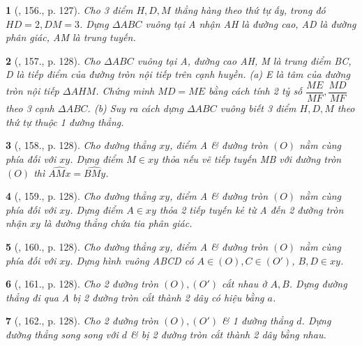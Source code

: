 \documentclass{article}
\newtheorem{baitoan}{}
\begin{document}
\begin{baitoan}[\cite{Binh_Toan_9_tap_1}, 156., p. 127]
	Cho 3 điểm $H,D,M$ thẳng hàng theo thứ tự ấy, trong đó $HD = 2,DM = 3$. Dựng $\Delta ABC$ vuông tại A nhận AH là đường cao, AD là đường phân giác, AM là trung tuyến.
\end{baitoan}

\begin{baitoan}[\cite{Binh_Toan_9_tap_1}, 157., p. 128]
	Cho $\Delta ABC$ vuông tại A, đường cao AH, M là trung điểm BC, D là tiếp điểm của đường tròn nội tiếp trên cạnh huyền. (a) E là tâm của đường tròn nội tiếp $\Delta AHM$. Chứng minh $MD = ME$ bằng cách tính 2 tỷ số $\dfrac{ME}{MF},\dfrac{MD}{MF}$ theo 3 cạnh $\Delta ABC$. (b) Suy ra cách dựng $\Delta ABC$ vuông biết 3 điểm $H,D,M$ theo thứ tự thuộc 1 đường thẳng.
\end{baitoan}

\begin{baitoan}[\cite{Binh_Toan_9_tap_1}, 158., p. 128]
	Cho đường thẳng $xy$, điểm A \& đường tròn $(O)$ nằm cùng phía đối với $xy$. Dựng điểm $M\in xy$ thỏa nếu vẽ tiếp tuyến MB với đường tròn $(O)$ thì $\widehat{AMx} = \widehat{BMy}$.
\end{baitoan}

\begin{baitoan}[\cite{Binh_Toan_9_tap_1}, 159., p. 128]
	Cho đường thẳng $xy$, điểm A \& đường tròn $(O)$ nằm cùng phía đối với $xy$. Dựng điểm $A\in xy$ thỏa 2 tiếp tuyến kẻ từ A đến 2 đường tròn nhận $xy$ là đường thẳng chứa tia phân giác.
\end{baitoan}

\begin{baitoan}[\cite{Binh_Toan_9_tap_1}, 160., p. 128]
	Cho đường thẳng $xy$, điểm A \& đường tròn $(O)$ nằm cùng phía đối với $xy$. Dựng hình vuông ABCD có $A\in(O),C\in(O')$, $B,D\in xy$.
\end{baitoan}

\begin{baitoan}[\cite{Binh_Toan_9_tap_1}, 161., p. 128]
	Cho 2 đường tròn $(O),(O')$ cắt nhau ở $A,B$. Dựng đường thẳng đi qua A bị 2 đường tròn cắt thành 2 dây có hiệu bằng $a$.
\end{baitoan}

\begin{baitoan}[\cite{Binh_Toan_9_tap_1}, 162., p. 128]
	Cho 2 đường tròn $(O),(O')$ \& 1 đường thẳng $d$. Dựng đường thẳng song song với $d$ \& bị 2 đường tròn cắt thành 2 dây bằng nhau.
\end{baitoan}
\end{document}
